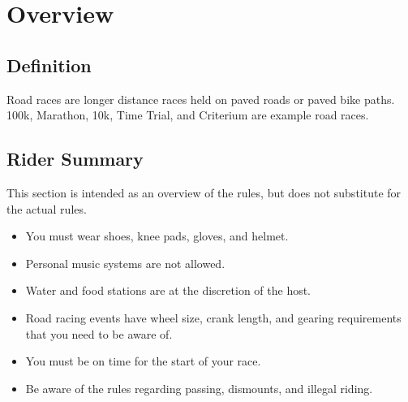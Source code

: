 \chapter{Overview \label{chap:road_racing}}

\section{Definition}

Road races are longer distance races held on paved roads or paved bike paths. 100k, Marathon, 10k, Time Trial, and Criterium are example road races.

\section{Rider Summary}

This section is intended as an overview of the rules, but does not
substitute for the actual rules.

\begin{itemize}
\item You must wear shoes, knee pads, gloves, and helmet.
\item Personal music systems are not allowed.
\item Water and food stations are at the discretion of the host.
\item Road racing events have wheel size, crank length, and gearing 
requirements that you need to be aware of.
\item You must be on time for the start of your race.
\item Be aware of the rules regarding passing, dismounts, and illegal riding.
\end{itemize}